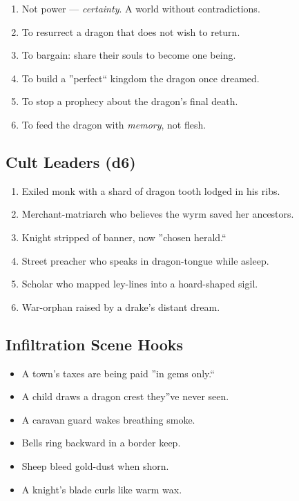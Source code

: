 \documentclass[11pt,letterpaper]{article}
\begin{document}
\begin{enumerate}[leftmargin=*]
\item Not power --- \textit{certainty}. A world without contradictions.
\item To resurrect a dragon that does not wish to return.
\item To bargain: share their souls to become one being.
\item To build a ''perfect`` kingdom the dragon once dreamed.
\item To stop a prophecy about the dragon's final death.
\item To feed the dragon with \textit{memory}, not flesh.
\end{enumerate}

\subsection{Cult Leaders (d6)}

\begin{enumerate}[leftmargin=*]
\item Exiled monk with a shard of dragon tooth lodged in his ribs.
\item Merchant-matriarch who believes the wyrm saved her ancestors.
\item Knight stripped of banner, now ''chosen herald.``
\item Street preacher who speaks in dragon-tongue while asleep.
\item Scholar who mapped ley-lines into a hoard-shaped sigil.
\item War-orphan raised by a drake's distant dream.
\end{enumerate}

\subsection{Infiltration Scene Hooks}

\begin{itemize}[leftmargin=*]
\item A town's taxes are being paid ''in gems only.``
\item A child draws a dragon crest they''ve never seen.
\item A caravan guard wakes breathing smoke.
\item Bells ring backward in a border keep.
\item Sheep bleed gold-dust when shorn.
\item A knight's blade curls like warm wax.
\end{itemize}
\end{document}
